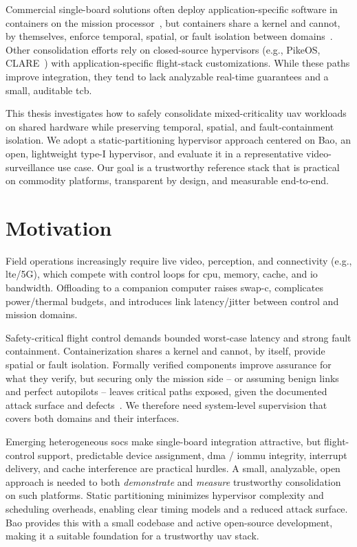 Commercial single-board solutions often deploy application-specific software
in containers on the mission processor~\cite{skynodeS,auterion-sw-services}, but
containers share a kernel and cannot, by themselves, enforce temporal, spatial,
or fault isolation between domains~\cite{wang_enabling_2018}. Other consolidation
efforts rely on closed-source hypervisors (e.g., PikeOS, CLARE~\cite{cittadini_supporting_2023})
with application-specific flight-stack customizations. While these paths improve
integration, they tend to lack analyzable real-time guarantees and a small,
auditable \gls{tcb}.

This thesis investigates how to safely consolidate mixed-criticality
\gls{uav} workloads on shared hardware while preserving temporal, spatial, and
fault-containment isolation. We adopt a static-partitioning hypervisor approach
centered on Bao, an open, lightweight type-I hypervisor, and evaluate it in a
representative video-surveillance use case. Our goal is a trustworthy reference
stack that is practical on commodity platforms, transparent by design, and
measurable end-to-end.

\section{Motivation}
\label{sec:motivation}
Field operations increasingly require live video, perception, and connectivity
(e.g., \gls{lte}/5G), which compete with control loops for \gls{cpu}, memory, cache, and \gls{io}
bandwidth. Offloading to a companion computer raises \gls{swap-c}, complicates
power/thermal budgets, and introduces link latency/jitter between control and
mission domains.

Safety-critical flight control demands bounded worst-case latency and strong
fault containment. Containerization shares a kernel and cannot, by itself,
provide spatial or fault isolation. Formally verified components improve
assurance for what they verify, but securing only the mission side -- or
assuming benign links and perfect autopilots -- leaves critical paths exposed,
given the documented attack surface and
defects~\cite{nassi2021sok,wang_exploratory_2021,buquerin2018security}. We
therefore need system-level supervision that covers both domains and their interfaces.

Emerging heterogeneous \glspl{soc} make single-board integration attractive, but
flight-control support, predictable device assignment, \gls{dma} / \gls{iommu}
integrity, interrupt delivery, and cache interference are practical hurdles. A small, analyzable, open approach is needed to both
\emph{demonstrate} and \emph{measure} trustworthy consolidation on such
platforms.
%
Static partitioning minimizes hypervisor complexity and scheduling overheads,
enabling clear timing models and a reduced attack surface. Bao provides this
with a small codebase and active open-source development, making it a suitable
foundation for a trustworthy \gls{uav} stack.

